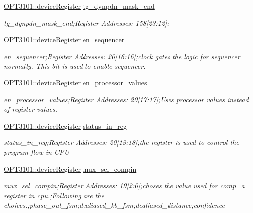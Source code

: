 \begin{DoxyCompactItemize}
\mbox{\hyperlink{class_o_p_t3101_1_1device_register}{O\+P\+T3101\+::device\+Register}} \mbox{\hyperlink{class_o_p_t3101_1_1registers_a4e0bc00c21546c38705ff42eba70230f}{tg\+\_\+dynpdn\+\_\+mask\+\_\+end}}
\begin{DoxyCompactList}\small\item\em tg\+\_\+dynpdn\+\_\+mask\+\_\+end;Register Addresses\+: 158\mbox{[}23\+:12\mbox{]}; \end{DoxyCompactList}\item 
\mbox{\hyperlink{class_o_p_t3101_1_1device_register}{O\+P\+T3101\+::device\+Register}} \mbox{\hyperlink{class_o_p_t3101_1_1registers_a5aa127e2bb97659c3f7771f2caa204aa}{en\+\_\+sequencer}}
\begin{DoxyCompactList}\small\item\em en\+\_\+sequencer;Register Addresses\+: 20\mbox{[}16\+:16\mbox{]};clock gates the logic for sequencer normally. This bit is used to enable sequencer. \end{DoxyCompactList}\item 
\mbox{\hyperlink{class_o_p_t3101_1_1device_register}{O\+P\+T3101\+::device\+Register}} \mbox{\hyperlink{class_o_p_t3101_1_1registers_ac47b657b57e126c79e8ad13251ef8695}{en\+\_\+processor\+\_\+values}}
\begin{DoxyCompactList}\small\item\em en\+\_\+processor\+\_\+values;Register Addresses\+: 20\mbox{[}17\+:17\mbox{]};Uses processor values instead of register values. \end{DoxyCompactList}\item 
\mbox{\hyperlink{class_o_p_t3101_1_1device_register}{O\+P\+T3101\+::device\+Register}} \mbox{\hyperlink{class_o_p_t3101_1_1registers_a66aabf74083c7c779d82766da1c15fd3}{status\+\_\+in\+\_\+reg}}
\begin{DoxyCompactList}\small\item\em status\+\_\+in\+\_\+reg;Register Addresses\+: 20\mbox{[}18\+:18\mbox{]};the register is used to control the program flow in C\+PU \end{DoxyCompactList}\item 
\mbox{\hyperlink{class_o_p_t3101_1_1device_register}{O\+P\+T3101\+::device\+Register}} \mbox{\hyperlink{class_o_p_t3101_1_1registers_aaaa862ca09860e4a8cec1095a9fa0b01}{mux\+\_\+sel\+\_\+compin}}
\begin{DoxyCompactList}\small\item\em mux\+\_\+sel\+\_\+compin;Register Addresses\+: 19\mbox{[}2\+:0\mbox{]};choses the value used for comp\+\_\+a register in cpu.;Following are the choices.;phase\+\_\+out\+\_\+fsm;dealiased\+\_\+kb\+\_\+fsm;dealiased\+\_\+distance;confidence \end{DoxyCompactList}\item 

\end{DoxyCompactItemize}
